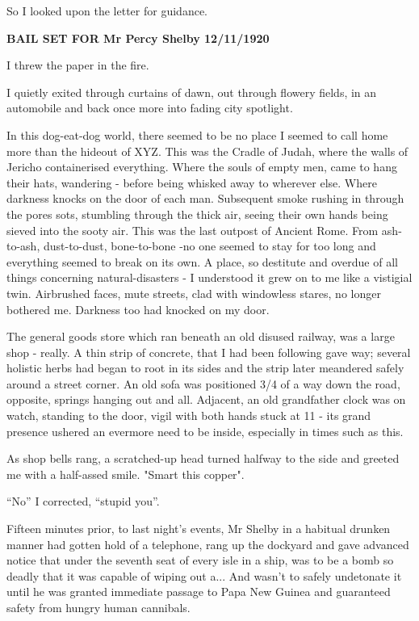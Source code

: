 \documentclass[12pt,openany]{book}
\begin{document}
So I looked upon the letter
for guidance.

\textbf{BAIL SET FOR Mr Percy Shelby
12/11/1920}

I threw the paper in the fire.

I quietly exited through curtains
of dawn, out through flowery
fields, in an automobile
and back once more into fading
city spotlight.

In this dog-eat-dog world,
there seemed to be no place
I seemed to call home more
than the hideout of XYZ. This was
the Cradle of Judah, where
the walls of Jericho
containerised everything.
Where the souls of empty men,
came to hang their hats, wandering -
before being whisked away to wherever
else. Where darkness
knocks on the door of each man.
Subsequent smoke rushing in through
the pores sots, stumbling through
the thick air, seeing their own hands
being sieved into the sooty air.
This was the last outpost of Ancient
Rome. From ash-to-ash, dust-to-dust,
bone-to-bone -no one seemed
to stay for too long and everything seemed
to break on its own. A place,
so destitute and overdue of all
things concerning natural-disasters -
I understood it grew on to me like a
vistigial twin. Airbrushed faces,
mute streets, clad with windowless
stares, no longer bothered me.
Darkness too had knocked on my door.

The general goods store which ran beneath
an old disused railway, was a large shop
- really. A thin strip of concrete,
that I had been following gave way;
several holistic herbs had began
to root in its sides and the strip later
meandered safely around a street corner.
An old sofa was positioned 3/4 of
a way down the road, opposite,
springs hanging out and all. Adjacent,
an old grandfather clock
was on watch, standing
to the door, vigil with both
hands stuck at 11 - its grand
presence ushered an
evermore need to be inside,
especially in times such as this.

As shop bells rang, a scratched-up
head turned halfway to the side and
greeted me with a half-assed
smile. "Smart this copper".

``No'' I corrected, ``stupid you''.

Fifteen minutes prior, to last
night's events, Mr Shelby in
a habitual drunken manner
had gotten hold of a telephone,
rang up the dockyard and
gave advanced notice that under
the seventh seat of every isle
in a ship, was to be a bomb
so deadly that it was capable
of wiping out a... And wasn't
to safely undetonate it until
he was granted immediate passage
to Papa New Guinea and guaranteed
safety from hungry human cannibals.
\end{document}
